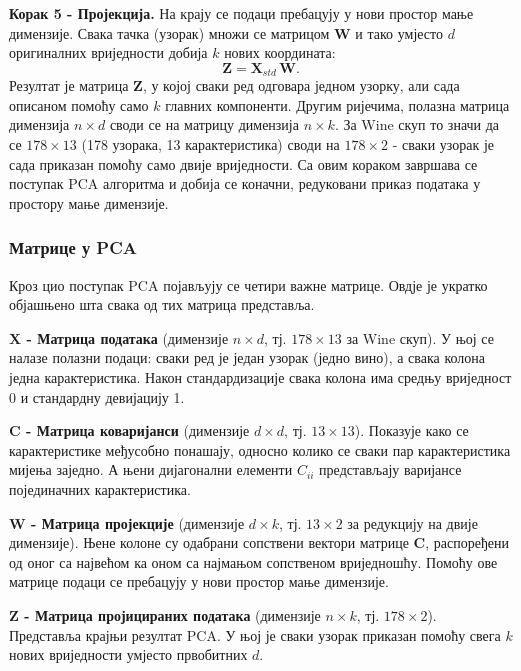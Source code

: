 \documentclass{article}
\begin{document}
	\textbf{Корак 5 - Пројекција.} На крају се подаци пребацују у нови простор мање димензије. Свака тачка (узорак) множи се матрицом $\mathbf{W}$ и тако умјесто $d$ оригиналних вриједности добија $k$ нових координата:
	\begin{equation} \label{eq:pca_proj}
		\mathbf{Z} = \mathbf{X}_{std}\,\mathbf{W}.
	\end{equation}
	Резултат је матрица $\mathbf{Z}$, у којој сваки ред одговара једном узорку, али сада описаном помоћу само $k$ главних компоненти. Другим ријечима, полазна матрица димензија $n \times d$ своди се на матрицу димензија $n \times k$. За Wine скуп то значи да се $178 \times 13$ (178 узорака, 13 карактеристика) своди на $178 \times 2$ - сваки узорак је сада приказан помоћу само двије вриједности. 
	Са овим кораком завршава се поступак PCA алгоритма и добија се коначни, редуковани приказ података у простору мање димензије.
	
	
	\subsubsection{Матрице у PCA}
	
	Кроз цио поступак PCA појављују се четири важне матрице. Овдје је укратко објашњено шта свака од тих матрица представља.
	
	\textbf{$\mathbf{X}$ - Матрица података} (димензије $n \times d$, тј. $178 \times 13$ за Wine скуп). У њој се налазе полазни подаци: сваки ред је један узорак (једно вино), а свака колона једна карактеристика. Након стандардизације свака колона има средњу вриједност 0 и стандардну девијацију 1.
	
	\textbf{$\mathbf{C}$ - Матрица коваријанси} (димензије $d \times d$, тј. $13 \times 13$). Показује како се карактеристике међусобно понашају, односно колико се сваки пар карактеристика мијења заједно. А њени дијагонални елементи $C_{ii}$ представљају варијансе појединачних карактеристика.
	
	\textbf{$\mathbf{W}$ - Матрица пројекције} (димензије $d \times k$, тј. $13 \times 2$ за редукцију на двије димензије). Њене колоне су одабрани сопствени вектори матрице $\mathbf{C}$, распоређени од оног са највећом ка оном са најмањом сопственом вриједношћу. Помоћу ове матрице подаци се пребацују у нови простор мање димензије.
	
	\textbf{$\mathbf{Z}$ - Матрица пројицираних података} (димензије $n \times k$, тј. $178 \times 2$). Представља крајњи резултат PCA. У њој је сваки узорак приказан помоћу свега $k$ нових вриједности умјесто првобитних $d$.
	
\end{document}
